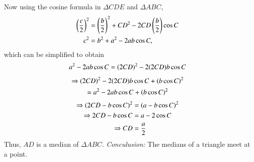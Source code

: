 %
Now using the cosine formula in $\Delta CDE$ and $\Delta ABC$, 
\begin{align}
\left(\frac{c}{2}\right)^2 &= \left(\frac{b}{2}\right)^2 +CD^2 -2CD \left(\frac{b}{2}\right) \cos C\\
c^2 &= b^2 + a^2 -2 a b \cos C,
\end{align}
which can be simplified to obtain
%
\begin{align}
a^2 - 2ab \cos C = \left(2CD\right)^2 - 2(2CD)b  \cos C 
\end{align}
\begin{multline}
\Rightarrow  \left(2CD\right)^2 - 2(2CD)b  \cos C  + \left(b \cos C \right)^2 
\\
= a^2 - 2ab \cos C + \left(b \cos C \right)^2 
\end{multline}
\begin{align}
\Rightarrow \left(2CD - b\cos C\right)^2 &= \left(a - b\cos C\right)^2 \\
\Rightarrow 2CD - b\cos C &= a - 2\cos C \\
\Rightarrow CD &= \frac{a}{2}
\end{align}
%
Thus, $AD$ is a median of $\Delta ABC$.  
%
{\em Conculusion:} The medians of a triangle meet at a point.